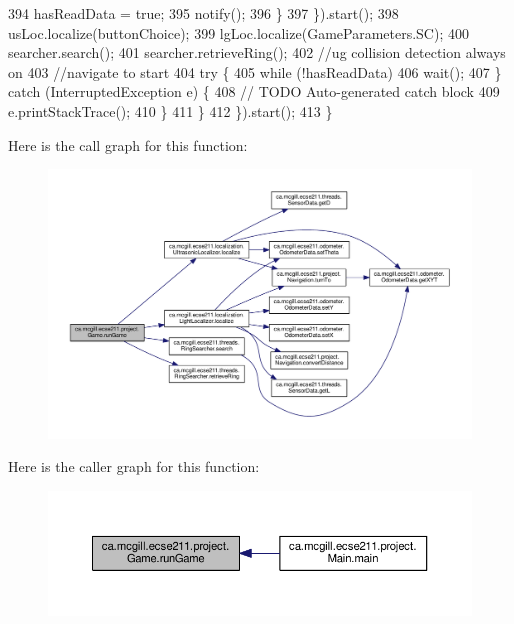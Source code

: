 \begin{DoxyCode}
394             hasReadData = \textcolor{keyword}{true};
395             notify();
396           \}
397         \}).start();
398         usLoc.localize(buttonChoice);
399         lgLoc.localize(GameParameters.SC);
400         searcher.search();
401         searcher.retrieveRing();
402         \textcolor{comment}{//ug collision detection always on}
403         \textcolor{comment}{//navigate to start}
404         \textcolor{keywordflow}{try} \{
405           \textcolor{keywordflow}{while} (!hasReadData)
406             wait();
407         \} \textcolor{keywordflow}{catch} (InterruptedException e) \{
408           \textcolor{comment}{// TODO Auto-generated catch block}
409           e.printStackTrace();
410         \}
411       \}
412     \}).start();
413   \}
\end{DoxyCode}
Here is the call graph for this function\+:
\nopagebreak
\begin{figure}[H]
\begin{center}
\leavevmode
\includegraphics[width=350pt]{enumca_1_1mcgill_1_1ecse211_1_1project_1_1_game_a790740a4ed299c9b985401ea8c4d5010_cgraph}
\end{center}
\end{figure}
Here is the caller graph for this function\+:
\nopagebreak
\begin{figure}[H]
\begin{center}
\leavevmode
\includegraphics[width=350pt]{enumca_1_1mcgill_1_1ecse211_1_1project_1_1_game_a790740a4ed299c9b985401ea8c4d5010_icgraph}
\end{center}
\end{figure}


